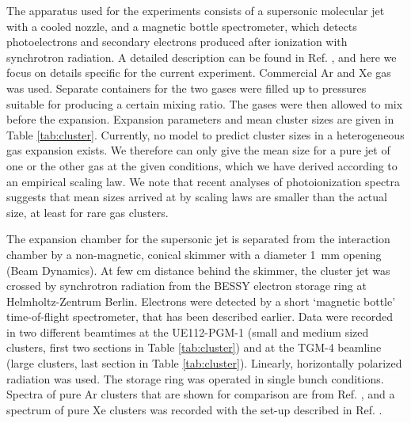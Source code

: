 %
%
The apparatus used for the experiments consists of a supersonic molecular jet with a cooled nozzle, and a magnetic bottle spectrometer, which detects photoelectrons and secondary electrons produced after ionization with synchrotron radiation.\cite{arion} 
A detailed description can be found in Ref. , and here we focus on details specific for the current experiment. Commercial Ar and Xe gas was used. 
Separate containers for the two gases were filled up to pressures suitable for producing a certain mixing ratio. The gases were then allowed to mix before the expansion. 
Expansion parameters and mean cluster sizes are given in Table \ref{tab:cluster}. 
Currently, no model to predict cluster sizes in a heterogeneous gas expansion exists. 
We therefore can only give the mean size for a pure jet of one or the other gas at the given conditions, which we have derived according to an empirical scaling law.\cite{hagena1981} 
We note that recent analyses of photoionization spectra suggests that  mean sizes arrived at by scaling laws are smaller than the actual size, at least for rare gas clusters.\cite{bergersen,hergenhahnprb,foerstel_arg2_2011}

The expansion chamber for the supersonic jet is separated from the interaction chamber by a non-magnetic, conical skimmer with a diameter 1~mm opening (Beam Dynamics). 
At few cm distance behind the skimmer, the cluster jet was crossed by synchrotron radiation from the BESSY electron storage ring at Helmholtz-Zentrum Berlin. 
Electrons were detected by a short `magnetic bottle' time-of-flight spectrometer, that has been described earlier.\cite{mucke_review} 
Data were recorded in two different beamtimes at the UE112-PGM-1 (small and medium sized clusters, first two sections in Table \ref{tab:cluster}) and at the TGM-4 beamline (large clusters, last section in Table \ref{tab:cluster}). 
Linearly, horizontally polarized radiation was used. 
The storage ring was operated in single bunch conditions.
Spectra of pure Ar clusters that are shown for comparison are from Ref. , and a spectrum of pure Xe clusters was recorded with the set-up described in Ref. .
